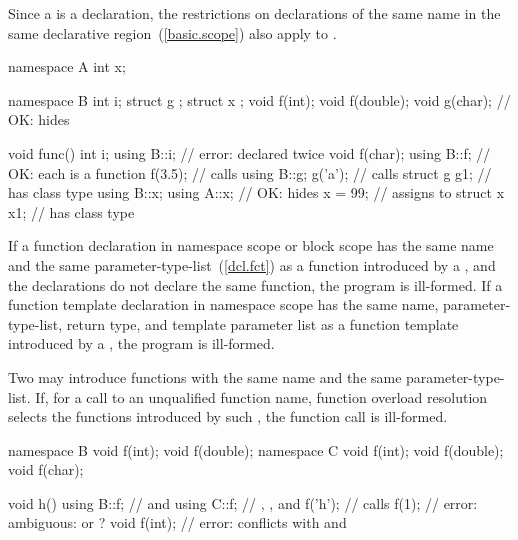 \pnum
Since a  is a declaration, the restrictions
on declarations of the same name in the same declarative
region~(\ref{basic.scope}) also apply to .
\begin{example}

\begin{codeblock}
namespace A {
  int x;
}

namespace B {
  int i;
  struct g { };
  struct x { };
  void f(int);
  void f(double);
  void g(char);     // OK: hides 
}

void func() {
  int i;
  using B::i;       // error:  declared twice
  void f(char);
  using B::f;       // OK: each  is a function
  f(3.5);           // calls 
  using B::g;
  g('a');           // calls 
  struct g g1;      //  has class type 
  using B::x;
  using A::x;       // OK: hides 
  x = 99;           // assigns to 
  struct x x1;      //  has class type 
}
\end{codeblock}
\end{example}

\pnum
If a function declaration in namespace scope or block scope has the same
name and the same parameter-type-list~(\ref{dcl.fct}) as
a function introduced by a , and the
declarations do not declare the same function, the program is
ill-formed. If a function template declaration in namespace scope has
the same name, parameter-type-list, return type, and template
parameter list as a function template introduced by a
, the program is ill-formed.
\begin{note}
Two  may introduce functions with the same
name and the same parameter-type-list. If, for a call to an unqualified
function name, function overload resolution selects the functions
introduced by such , the function call is
ill-formed.
\begin{example}

\begin{codeblock}
namespace B {
  void f(int);
  void f(double);
}
namespace C {
  void f(int);
  void f(double);
  void f(char);
}

void h() {
  using B::f;       //  and 
  using C::f;       // , , and 
  f('h');           // calls 
  f(1);             // error: ambiguous:  or ?
  void f(int);      // error:  conflicts with  and 
}
\end{codeblock}
\end{example}
\end{note}

